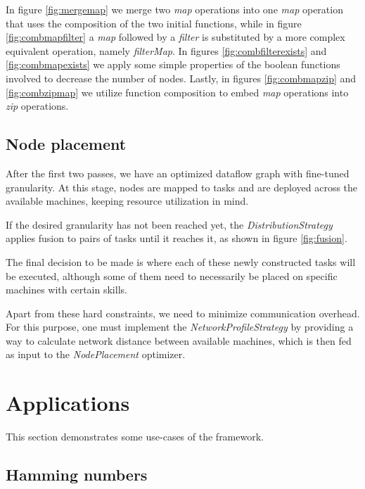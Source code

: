 \documentclass[sigplan,review,anonymous]{acmart}
\begin{document}
In figure \ref{fig:mergemap} we merge two \textit{map} operations into
one \textit{map} operation that uses the composition of the two initial
functions, while in figure \ref{fig:combmapfilter} a \textit{map} followed
by a \textit{filter} is substituted by a more complex equivalent operation,
namely \textit{filterMap}. In figures \ref{fig:combfilterexists} and
\ref{fig:combmapexists} we apply some simple properties of the boolean functions
involved to decrease the number of nodes. Lastly, in figures \ref{fig:combmapzip} and
\ref{fig:combzipmap} we utilize function composition to embed \textit{map}
operations into \textit{zip} operations.

\subsection{Node placement}

After the first two passes, we have an optimized dataflow graph with fine-tuned
granularity. At this stage, nodes are mapped to tasks and are deployed across
the available machines, keeping resource utilization in mind.

If the desired granularity has not been reached yet, the
\textit{DistributionStrategy} applies fusion to pairs of tasks until it reaches
it, as shown in figure \ref{fig:fusion}.


The final decision to be made is where each of these newly constructed tasks
will be executed, although some of them need to necessarily be placed on
specific machines with certain skills.

Apart from these hard constraints, we need to minimize communication overhead.
For this purpose, one must implement the \textit{NetworkProfileStrategy} by providing
a way to calculate network distance between available machines, which is then fed as input
to the \textit{NodePlacement} optimizer.

\section{Applications} \label{sec:applications}

This section demonstrates some use-cases of the framework.

\subsection{Hamming numbers}
\end{document}
